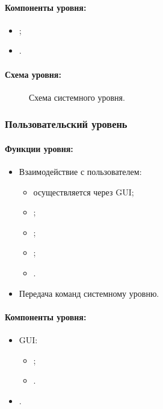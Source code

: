 \documentclass[12pt,a4paper,fullpage,titlepage]{article}
\begin{document}
\paragraph{Компоненты уровня:}
\begin{itemize}
	\item ;
	\item .\\
\end{itemize}

\paragraph{Схема уровня:}

\begin{figure}[thbp!]
	\centering
	
	\caption{Схема системного уровня.}
\end{figure}

\newpage
\subsubsection{Пользовательский уровень}

\paragraph{Функции уровня:}
\begin{itemize}
	\item Взаимодействие с пользователем:
	\begin{itemize}
		\item осуществляется через GUI;
		\item ;
		\item ;
		\item ;
		\item .
	\end{itemize}
	\item Передача команд системному уровню.\\
\end{itemize}

\paragraph{Компоненты уровня:}
\begin{itemize}
	\item GUI:
	\begin{itemize}
		\item ;
		\item .
	\end{itemize}
	\item .\\
\end{itemize}
\end{document}
